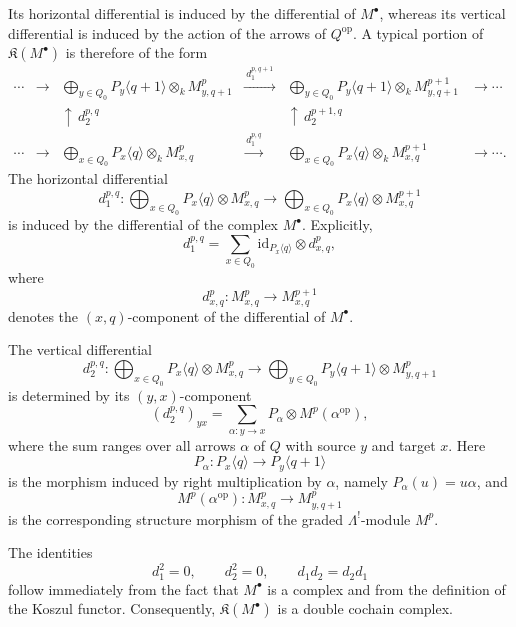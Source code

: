 \documentclass[11pt]{article}
\theoremstyle{definition}
\theoremstyle{remark}
\begin{document}
Its horizontal differential is induced by the differential of
\(M^\bullet\), whereas its vertical differential is induced by the action of
the arrows of \(Q^{\mathrm{op}}\). A typical portion of
\(\mathfrak K(M^\bullet)\) is therefore of the form
\[
\begin{array}{cccccc}
\cdots &
\longrightarrow &
\displaystyle\bigoplus_{y\in Q_0}
P_y\langle q+1\rangle\otimes_k M^p_{y,q+1}
&
\xrightarrow{\ d^{p,q+1}_1\ }
&
\displaystyle\bigoplus_{y\in Q_0}
P_y\langle q+1\rangle\otimes_k M^{p+1}_{y,q+1}
&
\longrightarrow \cdots
\\[1.4em]
&&
\uparrow\, d^{p,q}_2
&&
\uparrow\, d^{p+1,q}_2
&
\\[-0.2em]
\cdots &
\longrightarrow &
\displaystyle\bigoplus_{x\in Q_0}
P_x\langle q\rangle\otimes_k M^p_{x,q}
&
\xrightarrow{\ d^{p,q}_1\ }
&
\displaystyle\bigoplus_{x\in Q_0}
P_x\langle q\rangle\otimes_k M^{p+1}_{x,q}
&
\longrightarrow \cdots .
\end{array}
\]
The horizontal differential
\[
d^{p,q}_{1}\colon
\bigoplus_{x\in Q_{0}}
P_x\langle q\rangle\otimes M^p_{x,q}
\longrightarrow
\bigoplus_{x\in Q_{0}}
P_x\langle q\rangle\otimes M^{p+1}_{x,q}
\]
is induced by the differential of the complex \(M^\bullet\). Explicitly,
\[
d^{p,q}_{1}
=
\sum_{x\in Q_{0}}
\mathrm{id}_{P_x\langle q\rangle}
\otimes d^p_{x,q},
\]
where
\[
d^p_{x,q}\colon
M^p_{x,q}\longrightarrow M^{p+1}_{x,q}
\]
denotes the \((x,q)\)-component of the differential of \(M^\bullet\).

The vertical differential
\[
d^{p,q}_{2}\colon
\bigoplus_{x\in Q_{0}}
P_x\langle q\rangle\otimes M^p_{x,q}
\longrightarrow
\bigoplus_{y\in Q_{0}}
P_y\langle q+1\rangle\otimes M^p_{y,q+1}
\]
is determined by its \((y,x)\)-component
\[
(d^{p,q}_{2})_{yx}
=
\sum_{\alpha:y\to x}
P_\alpha\otimes M^p(\alpha^{\mathrm{op}}),
\]
where the sum ranges over all arrows \(\alpha\) of \(Q\) with
source \(y\) and target \(x\). Here
\[
P_\alpha\colon
P_x\langle q\rangle
\longrightarrow
P_y\langle q+1\rangle
\]
is the morphism induced by right multiplication by \(\alpha\),
namely \(P_\alpha(u)=u\alpha\), and
\[
M^p(\alpha^{\mathrm{op}})\colon
M^p_{x,q}
\longrightarrow
M^p_{y,q+1}
\]
is the corresponding structure morphism of the graded
\(\Lambda^!\)-module \(M^p\).

The identities
\[
d_1^2=0,
\qquad
d_2^2=0,
\qquad
d_1d_2=d_2d_1
\]
follow immediately from the fact that \(M^\bullet\) is a complex and from
the definition of the Koszul functor. Consequently,
\(\mathfrak K(M^\bullet)\) is a double cochain complex.
\end{document}

